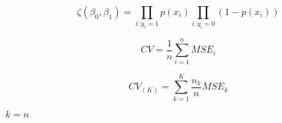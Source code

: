 \documentclass[10pt]{book}
\begin{document}
\begin{mdSnippets}
\begin{mdDisplaySnippet}[3434640df0abf3c9138498896d5d4bb3]
\[%
  \zeta(\beta_0,\beta_1)= \prod_{i:y_i=1}p(x_i)\prod_{i:y_i=0}(1-p(x_i))
\]%
\end{mdDisplaySnippet}%
\begin{mdDisplaySnippet}%
\[%
  CV=\frac{1}{n}\sum_{i=1}^{n}MSE_i
\]%
\end{mdDisplaySnippet}%
\begin{mdDisplaySnippet}[9ad5431ed4f79d040b8d2e68eb912e33]%
\[%
CV_{(K)}=\sum_{k=1}^{K}\frac{n_k}{n}MSE_k
\]%
\end{mdDisplaySnippet}%
\begin{mdInlineSnippet}[0a4b018f4a1382228c85c71a987d566f]%
$k=n$\end{mdInlineSnippet}%

\end{mdSnippets}
\end{document}

